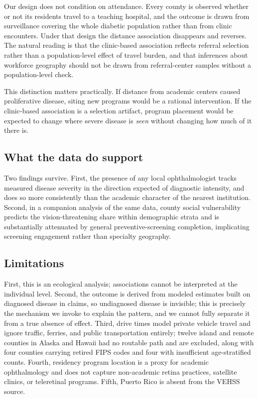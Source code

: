 \documentclass[11pt]{article}
\begin{document}
Our design does not condition on attendance. Every county is observed whether or
not its residents travel to a teaching hospital, and the outcome is drawn from
surveillance covering the whole diabetic population rather than from clinic
encounters. Under that design the distance association disappears and reverses.
The natural reading is that the clinic-based association reflects referral
selection rather than a population-level effect of travel burden, and that
inferences about workforce geography should not be drawn from referral-center
samples without a population-level check.

This distinction matters practically. If distance from academic centers caused
proliferative disease, siting new programs would be a rational intervention. If
the clinic-based association is a selection artifact, program placement would be
expected to change where severe disease is \emph{seen} without changing how much
of it there is.

\subsection{What the data do support}

Two findings survive. First, the presence of any local ophthalmologist tracks
measured disease severity in the direction expected of diagnostic intensity, and
does so more consistently than the academic character of the nearest
institution.
Second, in a companion analysis of the same data, county social vulnerability
predicts the vision-threatening share within demographic strata and is
substantially attenuated by general preventive-screening completion, implicating
screening engagement rather than specialty geography.

\subsection{Limitations}

First, this is an ecological analysis; associations cannot be interpreted at the
individual level. Second, the outcome is derived from modeled estimates built on
diagnosed disease in claims, so undiagnosed disease is invisible; this is
precisely the mechanism we invoke to explain the pattern, and we cannot fully
separate it from a true absence of effect. Third, drive times model private
vehicle travel and ignore traffic, ferries, and public transportation entirely;
twelve island and remote counties in Alaska and Hawaii had no routable path and
are excluded, along with four counties carrying retired FIPS codes and four with
insufficient age-stratified counts. Fourth, residency program location is a proxy
for academic ophthalmology and does not capture non-academic retina practices,
satellite clinics, or teleretinal programs. Fifth, Puerto Rico is absent from the
VEHSS source.
\end{document}
